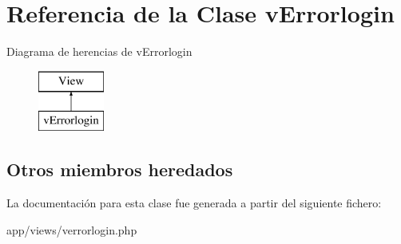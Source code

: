 \hypertarget{classv_errorlogin}{}\section{Referencia de la Clase v\+Errorlogin}
\label{classv_errorlogin}
Diagrama de herencias de v\+Errorlogin\begin{figure}[H]
\begin{center}
\leavevmode
\includegraphics[height=2.000000cm]{classv_errorlogin}
\end{center}
\end{figure}
\subsection*{Otros miembros heredados}


La documentación para esta clase fue generada a partir del siguiente fichero\+:\begin{DoxyCompactItemize}
\item 
app/views/verrorlogin.\+php\end{DoxyCompactItemize}
